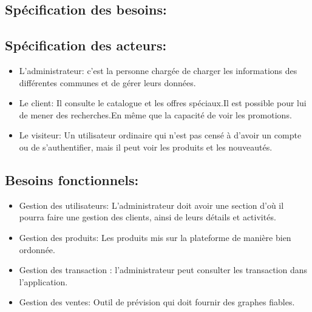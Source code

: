 \documentclass[a4paper]{report}
\begin{document}
\begin{doublespace}
    \section{Spécification des besoins:}

    \subsection{Spécification des acteurs:}
    \begin{itemize}
        \item L'administrateur: c'est la personne chargée
              de charger les informations des différentes communes et de
              gérer leurs données.
        \item  Le client: Il consulte le catalogue et les offres
              spéciaux.Il est possible pour lui de mener des recherches.En même que la
              capacité de voir les promotions.
        \item Le visiteur: Un utilisateur ordinaire qui n'est pas
              censé à d'avoir un compte ou  de s'authentifier, mais il peut voir les produits
              et les nouveautés.
    \end{itemize}
    \subsection{Besoins fonctionnels:}
    \begin{itemize}
        \item Gestion des utilisateurs: L'administrateur doit avoir
              une section d'où il pourra faire une gestion des clients, ainsi de leurs
              détails et activités.
        \item Gestion des produits: Les produits mis sur la
              plateforme de manière bien ordonnée.
        \item Gestion des transaction : l’administrateur peut
              consulter les transaction dans l'application.
        \item Gestion des ventes: Outil de prévision qui doit
              fournir des graphes fiables.
    \end{itemize}

\end{doublespace}
\end{document}
